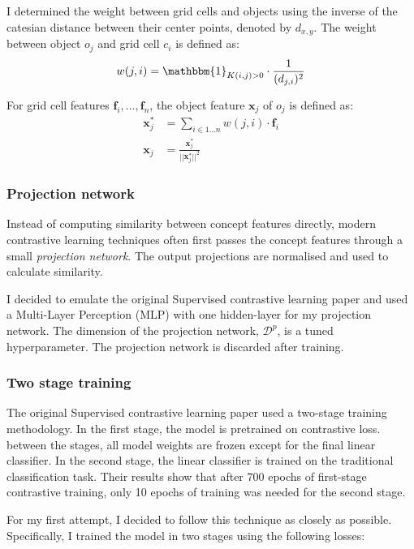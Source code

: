\documentclass[12pt,a4paper,twoside,openright]{report}
\begin{document}
I determined the weight between grid cells and objects using the inverse of the catesian distance between their center points, denoted by $d_{x, y}$. The weight between object $o_j$ and grid cell $c_i$ is defined as:
\begin{align}
    w(j, i) = \mathbbm{1}_{K(i,j)>0} \cdot \frac{1}{(d_{j, i})^2}
\end{align}

For grid cell features $\bm{f}_i, \dots, \bm{f}_n$, the object feature $\bm{x}_j$ of $o_j$ is defined as:
\begin{align}
    \bm{x}^*_j &= \sum\limits_{i\in 1\dots n} w(j, i) \cdot \bm{f}_i \\
    \bm{x}_j &= \frac{\bm{x}^*_j}{||\bm{x}^*_j||^2}
\end{align}

\subsubsection{Projection network}
Instead of computing similarity between concept features directly, modern contrastive learning techniques often first passes the concept features through a small \textit{projection network}. The output projections are normalised and used to calculate similarity. 

I decided to emulate the original Supervised contrastive learning paper \cite{khosla_supervised_2021} and used a Multi-Layer Perception (MLP) with one hidden-layer for my projection network. The dimension of the projection network, $\mathcal{D}^p$, is a tuned hyperparameter. The projection network is discarded after training.

\subsubsection{Two stage training}
The original Supervised contrastive learning paper \cite{khosla_supervised_2021} used a two-stage training methodology. In the first stage, the model is pretrained on contrastive loss. between the stages, all model weights are frozen except for the final linear classifier. In the second stage, the linear classifier is trained on the traditional classification task. Their results show that after 700 epochs of first-stage contrastive training, only 10 epochs of training was needed for the second stage.

For my first attempt, I decided to follow this technique as closely as possible. Specifically, I trained the model in two stages using the following losses:
\end{document}
